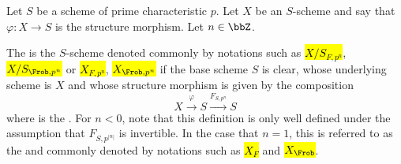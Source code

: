 \begin{definition} \label{definition:restriction_of_scalars_by_Frobenius_for_a_scheme}
    Let $S$ be a scheme of prime characteristic $p$. Let $X$ be an $S$-scheme and say that $\varphi: X \to S$ is the structure morphism. Let $n \in \bbZ$.

    The  is the $S$-scheme denoted commonly by notations such as \hl{$X/S_{F, p^n}$}, \hl{$X/S_{\Frob, p^n}$} or \hl{$X_{F, p^n}$}, \hl{$X_{\Frob, p^n}$} if the base scheme $S$ is clear, whose underlying scheme is $X$ and whose structure morphism is given by the composition
    $$X \xrightarrow{\varphi} S \xrightarrow{F_{S,p^n}}S$$
    where  is the . For $n < 0$, note that this definition is only well defined under the assumption that $F_{S,p^{|n|}}$ is invertible.  In the case that $n = 1$, this is referred to as the  and commonly denoted by notations such as \hl{$X_F$} and \hl{$X_{\Frob}$}. 
\end{definition}